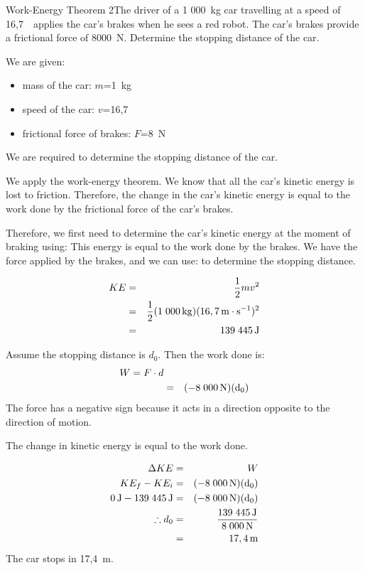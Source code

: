 \begin{wex}{Work-Energy Theorem 2}{The driver of a 1 000~kg car travelling at a speed of 16,7~\ms\ applies the car's brakes when he sees a red robot. The car's brakes provide a frictional force of 8000~N. Determine the stopping distance of the car.}
{
We are given:
\begin{itemize}
\item{mass of the car: $m$=1~kg}
\item{speed of the car: $v$=16,7~\ms}
\item{frictional force of brakes: $F$=8~N}
\end{itemize}
We are required to determine the stopping distance of the car.

We apply the work-energy theorem. We know that all the car's kinetic energy is lost to friction. Therefore, the change in the car's kinetic energy is equal to the work done by the frictional force of the car's brakes.

Therefore, we first need to determine the car's kinetic energy at the moment of braking using:
This energy is equal to the work done by the brakes. We have the force applied by the brakes, and we can use:
to determine the stopping distance.

\begin{eqnarray*}
KE&=&\frac{1}{2}mv^2\\
&=&\frac{1}{2}(1\;000\,\mathrm{kg})(16,7\,\mathrm{m \cdot s^{-1}})^2\\
&=&139\;445\,\mathrm{J}
\end{eqnarray*}

Assume the stopping distance is $d_0$. Then the work done is:
\begin{eqnarray*}
W=F\cdot d\\
&=&(-8\;000\,\rm{N})(d_0)
\end{eqnarray*}
The force has a negative sign because it acts in a direction opposite to the direction of motion.

The change in kinetic energy is equal to the work done.

\begin{eqnarray*}
\Delta KE &=&W\\
KE_f - KE_i&=&(-8\;000\,\rm{N})(d_0)\\
0\,\mathrm{J} - 139\;445\,\mathrm{J}&=&(-8\;000\,\rm{N})(d_0)\\
\therefore d_0&=&\frac{139\;445\,\mathrm{J}}{8\;000\,\rm{N}}\\
&=&17,4\,\rm{m}
\end{eqnarray*}
The car stops in 17,4~m.}
\end{wex}

